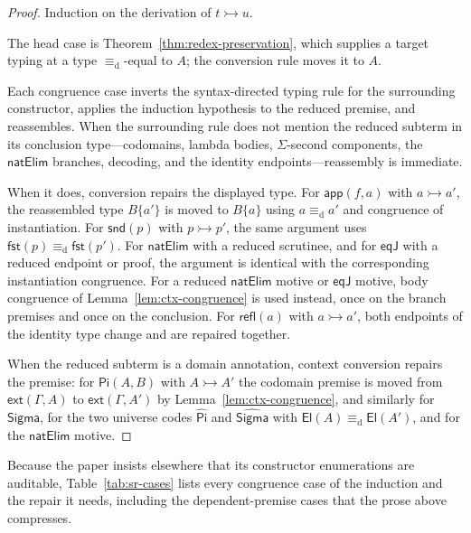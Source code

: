 \documentclass[10pt,reqno]{amsart}
\newcommand{\Ext}[2]{\mathsf{ext}(#1,#2)}
\newcommand{\PiTy}{\mathsf{Pi}}
\newcommand{\SigmaTy}{\mathsf{Sigma}}
\newcommand{\App}{\mathsf{app}}
\newcommand{\Fst}{\mathsf{fst}}
\newcommand{\Snd}{\mathsf{snd}}
\newcommand{\CodePi}{\widehat{\mathsf{Pi}}}
\newcommand{\CodeSigma}{\widehat{\mathsf{Sigma}}}
\newcommand{\El}{\mathsf{El}}
\newcommand{\Refl}{\mathsf{refl}}
\newcommand{\EqJ}{\mathsf{eqJ}}
\newcommand{\defeq}{\mathrel{\equiv_{\mathrm d}}}
\newcommand{\ctxred}{\mathrel{\rightarrowtail}}
\begin{document}
\begin{proof}
Induction on the derivation of \(t\ctxred u\).

The head case is Theorem~\ref{thm:redex-preservation}, which supplies a
target typing at a type \(\defeq\)-equal to \(A\); the conversion rule moves it
to \(A\).

Each congruence case inverts the syntax-directed typing rule for the
surrounding constructor, applies the induction hypothesis to the reduced
premise, and reassembles.  When the surrounding rule does not mention the
reduced subterm in its conclusion type---codomains, lambda bodies,
\(\Sigma\)-second components, the \(\mathsf{natElim}\) branches, decoding, and
the identity endpoints---reassembly is immediate.

When it does, conversion repairs the displayed type.  For
\(\App(f,a)\) with \(a\ctxred a'\), the reassembled type \(B\{a'\}\) is moved to
\(B\{a\}\) using \(a\defeq a'\) and congruence of instantiation.  For
\(\Snd(p)\) with \(p\ctxred p'\), the same argument uses
\(\Fst(p)\defeq\Fst(p')\).  For \(\mathsf{natElim}\) with a reduced
scrutinee, and for \(\EqJ\) with a reduced endpoint or proof, the argument is
identical with the corresponding instantiation congruence.  For a reduced
\(\mathsf{natElim}\) motive or \(\EqJ\) motive, body congruence of
Lemma~\ref{lem:ctx-congruence} is used instead, once on the branch premises and
once on the conclusion.  For \(\Refl(a)\) with \(a\ctxred a'\), both endpoints of
the identity type change and are repaired together.

When the reduced subterm is a domain annotation, context conversion repairs
the premise: for \(\PiTy(A,B)\) with \(A\ctxred A'\) the codomain premise is
moved from \(\Ext{\Gamma}{A}\) to \(\Ext{\Gamma}{A'}\) by
Lemma~\ref{lem:ctx-congruence}, and similarly for \(\SigmaTy\), for the two
universe codes \(\CodePi\) and \(\CodeSigma\) with \(\El(A)\defeq\El(A')\),
and for the \(\mathsf{natElim}\) motive.
\end{proof}

Because the paper insists elsewhere that its constructor enumerations are
auditable, Table~\ref{tab:sr-cases} lists every congruence case of the
induction and the repair it needs, including the dependent-premise cases that
the prose above compresses.
\end{document}
